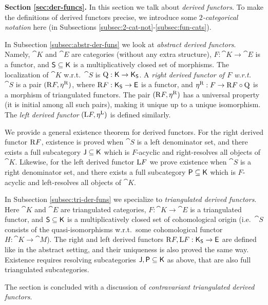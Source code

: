 \medskip \noindent 
{\bf Section \ref{sec:der-funcs}.}
In this section we talk about {\em derived functors}. To make the definitions 
of derived functors precise, we introduce some {\em $2$-categorical 
notation} here (in Subsections \ref{subsec:2-cat-not}-\ref{subsec:fun-cats}).

In Subsection \ref{subsec:abstr-der-funs} we look at {\em abstract derived 
functors}. Namely, $\cat{K}$ and $\cat{E}$ are categories (without any extra 
structure), $F : \cat{K} \to \cat{E}$ is a functor, and 
$\operatorname{\mathsf{S}} \subseteq \operatorname{\mathsf{K}}$ is a multiplicatively closed set of morphisms. 
The localization of $\cat{K}$ w.r.t.\ $\cat{S}$ is 
$\operatorname{Q} : \operatorname{\mathsf{K}} \to \operatorname{\mathsf{K}}_{\operatorname{\mathsf{S}}}$. 
A {\em right derived functor of $F$ w.r.t.\ $\cat{S}$} is a pair 
$(\mathrm{R} F ,\eta^{\mathrm{R}})$, where 
$\mathrm{R} F : \operatorname{\mathsf{K}}_{\operatorname{\mathsf{S}}} \to \operatorname{\mathsf{E}}$
is a functor, and 
$\eta^{\mathrm{R}} : F \to \mathrm{R} F \circ \operatorname{Q}$
is a morphism of triangulated functors. The pair $(\mathrm{R} F ,\eta^{\mathrm{R}})$ 
has a universal property (it is initial among all such pairs), making it unique 
up to a unique isomorphism. The  {\em left derived functor}
$(\mathrm{L} F ,\eta^{\mathrm{L}})$ is defined similarly.

We provide a general existence theorem for derived functors. For the right 
derived functor $\mathrm{R} F$, existence is proved when $\cat{S}$ is a left 
denominator set, and there exists a full 
subcategory $\operatorname{\mathsf{J}} \subseteq \operatorname{\mathsf{K}}$ which is $F$-acyclic and 
right-resolves all objects of $\cat{K}$.  Likewise, for the left derived functor
$\mathrm{L} F$ we prove existence when $\cat{S}$ is a right denominator set, and 
there exists a full subcategory $\operatorname{\mathsf{P}} \subseteq \operatorname{\mathsf{K}}$ which is $F$-acyclic and 
left-resolves all objects of $\cat{K}$. 

In Subsection \ref{subsec:tri-der-funs} we specialize to {\em triangulated 
derived functors}. Here $\cat{K}$ and $\cat{E}$ are triangulated categories, 
$F : \cat{K} \to \cat{E}$ is a triangulated functor, and 
$\operatorname{\mathsf{S}} \subseteq \operatorname{\mathsf{K}}$ is a multiplicatively closed set of cohomological 
origin (i.e.\ $\cat{S}$ consists of the quasi-isomorphisms w.r.t.\ 
some cohomological functor $H : \cat{K} \to \cat{M}$). The right and left 
derived functors 
$\mathrm{R} F, \mathrm{L} F : \operatorname{\mathsf{K}}_{\operatorname{\mathsf{S}}} \to \operatorname{\mathsf{E}}$
are defined like in the abstract setting, and their uniqueness 
is also proved the same way. Existence requires resolving subcategories 
$\operatorname{\mathsf{J}}, \operatorname{\mathsf{P}} \subseteq \operatorname{\mathsf{K}}$ as above, that are also full triangulated 
subcategories. 

The section is concluded with a discussion of {\em contravariant triangulated 
derived functors}. 

